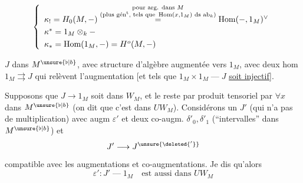 \[
\left\{\begin{array}{l}
\kappa_!=H_0(M,-)
\overset{\substack{\text{pour arg. dans }M\\
\text{(plus gén\textsuperscript{t}, tels que }\operatorname{Hom}(x,1_M)\text{ ds }\mathrm{ab}_k)}}{=}
\operatorname{Hom}(-,1_M)^\vee\\[3pt]
\kappa^*=1_M\otimes_k-\\[3pt]
\kappa_*=\operatorname{Hom}(1_M,-)=H^o(M,-)
\end{array}\right.
\]

$J$ dans $M^{\unsure{\flat|b}}$, avec structure d'algèbre augmentée vers
$1_M$, avec deux hom $1_M\rightrightarrows J$ qui relèvent
l'augmentation [et tels que
$1_M\times1_M\mathbin{\text{---}}J$ \uline{soit injectif}].


Supposons que $J\longrightarrow1_M$
soit dans $W_M$, et le reste
par produit tensoriel par $\forall x$ dans $M^{\unsure{\flat|b}}$
(on dit que c'est dans $UW_M$). Considérons
un    $J'$
(qui n'a pas de multiplication) avec
\deleted{$\unsure{\varepsilon}$} augm $\varepsilon'$ et deux co-augm.
$\delta'_0,\delta'_1$ (``intervalles'' dans $M^{\unsure{\flat|b}}$) et
\[
J'\longrightarrow J^{\unsure{\deleted{'}}}
\]
compatible avec les augmentations et
co-augmentations. Je dis qu'alors 
\[
\varepsilon':J'\mathbin{\text{---}}1_M\quad\text{est aussi dans }UW_M
\]


